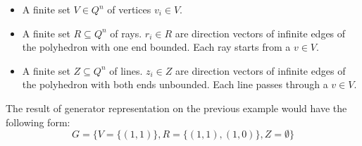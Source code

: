 \begin{itemize}
	\item A finite set $V\in Q^n$ of vertices $v_i \in V$.
	\item A finite set $R \subseteq Q^n$ of rays. $r_i \in R$ are direction vectors of infinite edges of the polyhedron with one end bounded. Each ray starts from a $v \in V$.
	\item  A finite set $Z \subseteq Q^n$ of lines. $z_i \in Z$ are direction vectors of infinite edges of the polyhedron with both ends unbounded. Each line passes through a $v \in V$.
\end{itemize}
The result of generator representation on the previous example would have the following form: 
\begin{equation}
	G = \{ V = \{(1,1)\}, R = \{(1,1),(1,0) \}, Z = \emptyset \}
\end{equation}
